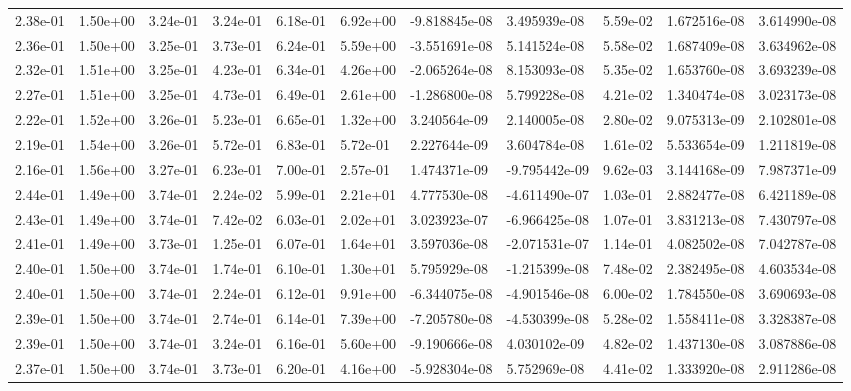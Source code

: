 \begin{longtable}{| p{} | p{} |}
2.38e-01 & 1.50e+00 & 3.24e-01 & 3.24e-01 & 6.18e-01 & 6.92e+00 & -9.818845e-08 &  3.495939e-08 &  5.59e-02 &  1.672516e-08 &  3.614990e-08 \\
2.36e-01 & 1.50e+00 & 3.25e-01 & 3.73e-01 & 6.24e-01 & 5.59e+00 & -3.551691e-08 &  5.141524e-08 &  5.58e-02 &  1.687409e-08 &  3.634962e-08 \\
2.32e-01 & 1.51e+00 & 3.25e-01 & 4.23e-01 & 6.34e-01 & 4.26e+00 & -2.065264e-08 &  8.153093e-08 &  5.35e-02 &  1.653760e-08 &  3.693239e-08 \\
2.27e-01 & 1.51e+00 & 3.25e-01 & 4.73e-01 & 6.49e-01 & 2.61e+00 & -1.286800e-08 &  5.799228e-08 &  4.21e-02 &  1.340474e-08 &  3.023173e-08 \\
2.22e-01 & 1.52e+00 & 3.26e-01 & 5.23e-01 & 6.65e-01 & 1.32e+00 &  3.240564e-09 &  2.140005e-08 &  2.80e-02 &  9.075313e-09 &  2.102801e-08 \\
2.19e-01 & 1.54e+00 & 3.26e-01 & 5.72e-01 & 6.83e-01 & 5.72e-01 &  2.227644e-09 &  3.604784e-08 &  1.61e-02 &  5.533654e-09 &  1.211819e-08 \\
2.16e-01 & 1.56e+00 & 3.27e-01 & 6.23e-01 & 7.00e-01 & 2.57e-01 &  1.474371e-09 & -9.795442e-09 &  9.62e-03 &  3.144168e-09 &  7.987371e-09 \\
2.44e-01 & 1.49e+00 & 3.74e-01 & 2.24e-02 & 5.99e-01 & 2.21e+01 &  4.777530e-08 & -4.611490e-07 &  1.03e-01 &  2.882477e-08 &  6.421189e-08 \\
2.43e-01 & 1.49e+00 & 3.74e-01 & 7.42e-02 & 6.03e-01 & 2.02e+01 &  3.023923e-07 & -6.966425e-08 &  1.07e-01 &  3.831213e-08 &  7.430797e-08 \\
2.41e-01 & 1.49e+00 & 3.73e-01 & 1.25e-01 & 6.07e-01 & 1.64e+01 &  3.597036e-08 & -2.071531e-07 &  1.14e-01 &  4.082502e-08 &  7.042787e-08 \\
2.40e-01 & 1.50e+00 & 3.74e-01 & 1.74e-01 & 6.10e-01 & 1.30e+01 &  5.795929e-08 & -1.215399e-08 &  7.48e-02 &  2.382495e-08 &  4.603534e-08 \\
2.40e-01 & 1.50e+00 & 3.74e-01 & 2.24e-01 & 6.12e-01 & 9.91e+00 & -6.344075e-08 & -4.901546e-08 &  6.00e-02 &  1.784550e-08 &  3.690693e-08 \\
2.39e-01 & 1.50e+00 & 3.74e-01 & 2.74e-01 & 6.14e-01 & 7.39e+00 & -7.205780e-08 & -4.530399e-08 &  5.28e-02 &  1.558411e-08 &  3.328387e-08 \\
2.39e-01 & 1.50e+00 & 3.74e-01 & 3.24e-01 & 6.16e-01 & 5.60e+00 & -9.190666e-08 &  4.030102e-09 &  4.82e-02 &  1.437130e-08 &  3.087886e-08 \\
2.37e-01 & 1.50e+00 & 3.74e-01 & 3.73e-01 & 6.20e-01 & 4.16e+00 & -5.928304e-08 &  5.752969e-08 &  4.41e-02 &  1.333920e-08 &  2.911286e-08 \\

\end{longtable}
